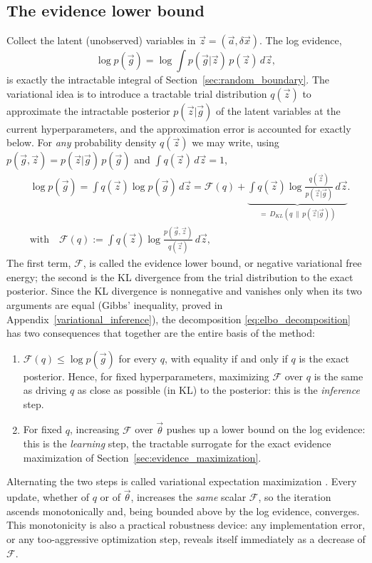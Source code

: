 \documentclass{article}
\begin{document}
\subsection{The evidence lower bound} \label{sec:elbo}
Collect the latent (unobserved) variables in $\vec z = (\vec a, \delta\vec x)$. The log evidence, 
\[
\log p(\vec g) = \log \int p(\vec g|\vec z)\, p(\vec z)\, d\vec z,
\]
is exactly the intractable integral of Section~\ref{sec:random_boundary}. The variational idea is to introduce a tractable trial distribution $q(\vec z)$ to approximate the intractable posterior $p(\vec z|\vec g)$ of the latent variables at the current hyperparameters, and the approximation error is accounted for exactly below. For \emph{any} probability density $q(\vec z)$ we may write, using $p(\vec g, \vec z) = p(\vec z|\vec g)\,p(\vec g)$ and $\int q(\vec z)\,d\vec z = 1$,
\begin{align}
    &\log p(\vec g) = \int q(\vec z) \log p(\vec g)\, d\vec z
    = \mathcal F(q) + \underbrace{\int q(\vec z) \log \frac{q(\vec z)}{p(\vec z|\vec g)}\, d\vec z}_{=\,D_{KL}(q \,\|\, p(\vec z|\vec g))}. \label{eq:elbo_decomposition}
    \\ \label{def:F}
    & \text{with} \quad 
    \mathcal F(q) := \int q(\vec z) \log \frac{p(\vec g, \vec z)}{q(\vec z)}\, d\vec z,
    \quad 
\end{align}
The first term, $\mathcal F$, is called the evidence lower bound, or negative variational free energy; the second is the KL divergence from the trial distribution to the exact posterior. Since the KL divergence is nonnegative and vanishes only when its two arguments are equal (Gibbs' inequality, proved in Appendix~\ref{variational_inference}), the decomposition \eqref{eq:elbo_decomposition} has two consequences that together are the entire basis of the method:
\begin{enumerate}
    \item $\mathcal F(q) \le \log p(\vec g)$ for every $q$, with equality if and only if $q$ is the exact posterior. Hence, for fixed hyperparameters, maximizing $\mathcal F$ over $q$ is the same as driving $q$ as close as possible (in KL) to the posterior: this is the \emph{inference} step.
    \item For fixed $q$, increasing $\mathcal F$ over $\vec\theta$ pushes up a lower bound on the log evidence: this is the \emph{learning} step, the tractable surrogate for the exact evidence maximization of Section~\ref{sec:evidence_maximization}.
\end{enumerate}
Alternating the two steps is called variational expectation maximization \cite{beal2003variational,bishop2006pattern}. Every update, whether of $q$ or of $\vec\theta$, increases the \emph{same} scalar $\mathcal F$, so the iteration ascends monotonically and, being bounded above by the log evidence, converges. This monotonicity is also a practical robustness device: any implementation error, or any too-aggressive optimization step, reveals itself immediately as a decrease of $\mathcal F$.
\end{document}
